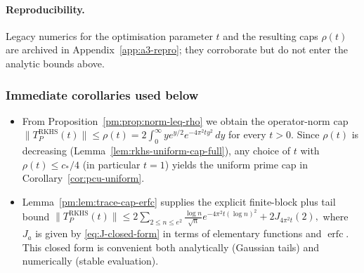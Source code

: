 \paragraph{Reproducibility.}
Legacy numerics for the optimisation parameter $t$ and the resulting caps $\rho(t)$ are archived in
Appendix~\ref{app:a3-repro}; they corroborate but do not enter the analytic bounds above.

\subsubsection{Immediate corollaries used below}
\begin{itemize}
  \item From Proposition~\ref{pm:prop:norm-leq-rho} we obtain the operator-norm cap
  \(
    \|T_P^{\mathrm{RKHS}}(t)\|\le \rho(t)=2\int_{0}^{\infty} y e^{y/2} e^{-4\pi^2 t y^2}\,dy
  \)
  for every $t>0$. Since $\rho(t)$ is decreasing (Lemma~\ref{lem:rkhs-uniform-cap-full}), any choice of $t$
  with $\rho(t)\le c_*/4$ (in particular $t=1$) yields the uniform prime cap in Corollary~\ref{cor:pcu-uniform}.
  \item Lemma~\ref{pm:lem:trace-cap-erfc} supplies the explicit finite-block plus tail bound
  \(
    \|T_P^{\mathrm{RKHS}}(t)\| \le 2\sum_{2\le n\le e^{2}} \frac{\log n}{\sqrt n} e^{-4\pi^2 t(\log n)^2} + 2 J_{4\pi^2 t}(2),
  \)
  where $J_a$ is given by \eqref{eq:J-closed-form} in terms of elementary functions and $\operatorname{erfc}$. This closed form is convenient both analytically (Gaussian tails) and numerically (stable evaluation).
\end{itemize}
